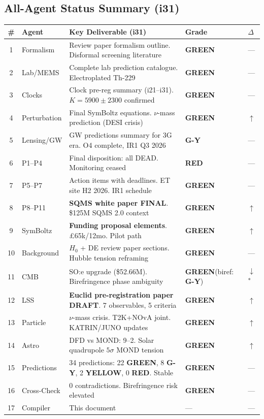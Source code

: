 \documentclass[11pt,a4paper]{article}
\newcommand{\GREEN}{\textcolor{dfdgreen}{\textbf{GREEN}}}
\newcommand{\YELLOW}{\textcolor{dfdyellow}{\textbf{YELLOW}}}
\newcommand{\RED}{\textcolor{dfdred}{\textbf{RED}}}
\newcommand{\GY}{\textcolor{dfdgy}{\textbf{G-Y}}}
\begin{document}
\subsection{All-Agent Status Summary (i31)}

\begin{center}
\begin{longtable}{clp{6cm}ll}
\toprule
\textbf{\#} & \textbf{Agent} & \textbf{Key Deliverable (i31)} & \textbf{Grade} & \textbf{$\Delta$} \\
\midrule
\endfirsthead
1 & Formalism & Review paper formalism outline. Disformal screening literature & \GREEN & --- \\
2 & Lab/MEMS & Complete lab prediction catalogue. Electroplated Th-229 & \GREEN & --- \\
3 & Clocks & Clock pre-reg summary (i21--i31). $K = 5900 \pm 2300$ confirmed & \GREEN & --- \\
4 & Perturbation & Final SymBoltz equations. $\nu$-mass prediction (DESI crisis) & \GREEN & $\uparrow$ \\
5 & Lensing/GW & GW predictions summary for 3G era. O4 complete, IR1 Q3 2026 & \GY & --- \\
6 & P1--P4 & Final disposition: all DEAD. Monitoring ceased & \RED & --- \\
7 & P5--P7 & Action items with deadlines. ET site H2 2026. IR1 schedule & \GREEN & --- \\
8 & P8--P11 & \textbf{SQMS white paper FINAL}. \$125M SQMS 2.0 context & \GREEN & $\uparrow$ \\
9 & SymBoltz & \textbf{Funding proposal elements}. \pounds 65k/12mo. Pilot path & \GREEN & $\uparrow$ \\
10 & Background & $H_0$ + DE review paper sections. Hubble tension reframing & \GREEN & --- \\
11 & CMB & SO:e upgrade (\$52.66M). Birefringence phase ambiguity & \GREEN (biref: \GY) & $\downarrow$\textsuperscript{*} \\
12 & LSS & \textbf{Euclid pre-registration paper DRAFT}. 7 observables, 5 criteria & \GREEN & $\uparrow$ \\
13 & Particle & $\nu$-mass crisis. T2K+NOvA joint. KATRIN/JUNO updates & \GREEN & $\uparrow$ \\
14 & Astro & DFD vs MOND: 9--2. Solar quadrupole $5\sigma$ MOND tension & \GREEN & $\uparrow$ \\
15 & Predictions & 34 predictions: 22 \GREEN, 8 \GY, 2 \YELLOW, 0 \RED. Stable & \GREEN & --- \\
16 & Cross-Check & 0 contradictions. Birefringence risk elevated & \GREEN & --- \\
17 & Compiler & This document & --- & --- \\
\bottomrule
\end{longtable}
\end{center}
\end{document}
